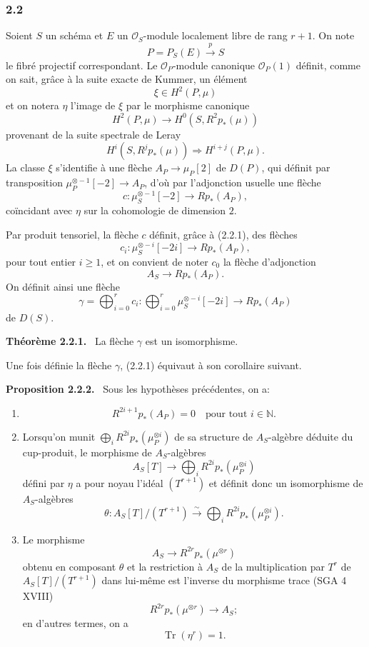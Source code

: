\documentclass[11pt]{article}
\newenvironment{statement}[1]{\par\medskip\noindent\textbf{#1.}\ }{\par\medskip}
\begin{document}
\subsubsection*{2.2}
Soient $S$ un schéma et $E$ un $\mathcal O_S$-module localement libre de rang $r+1$. On note
\[
P=P_S(E)\xrightarrow{p}S
\]
le fibré projectif correspondant. Le $\mathcal O_P$-module canonique $\mathcal O_P(1)$ définit, comme on sait, grâce à la suite exacte de Kummer, un élément
\[
\xi\in H^2(P,\mu)
\]
et on notera $\eta$ l'image de $\xi$ par le morphisme canonique
\[
H^2(P,\mu)\longrightarrow H^0(S,R^2p_*(\mu))
\]
provenant de la suite spectrale de Leray
\[
H^i(S,R^jp_*(\mu))\Rightarrow H^{i+j}(P,\mu).
\]
La classe $\xi$ s'identifie à une flèche $A_P\to\mu_P[2]$ de $D(P)$, qui définit par transposition $\mu_P^{\otimes -1}[-2]\to A_P$, d'où par l'adjonction usuelle une flèche
\[
c:\mu_S^{\otimes -1}[-2]\longrightarrow Rp_*(A_P),
\]
coïncidant avec $\eta$ sur la cohomologie de dimension $2$.

Par produit tensoriel, la flèche $c$ définit, grâce à (2.2.1), des flèches
\[
c_i:\mu_S^{\otimes -i}[-2i]\longrightarrow Rp_*(A_P),
\]
pour tout entier $i\ge1$, et on convient de noter $c_0$ la flèche d'adjonction
\[
A_S\longrightarrow Rp_*(A_P).
\]
On définit ainsi une flèche
\[
\gamma=\bigoplus_{i=0}^{r}c_i:
\bigoplus_{i=0}^{r}\mu_S^{\otimes -i}[-2i]\longrightarrow Rp_*(A_P)
\]
de $D(S)$.

\begin{statement}{Théorème 2.2.1}
La flèche $\gamma$ est un isomorphisme.
\end{statement}

Une fois définie la flèche $\gamma$, (2.2.1) équivaut à son corollaire suivant.

\begin{statement}{Proposition 2.2.2}
Sous les hypothèses précédentes, on a:
\begin{enumerate}[label=\alph*)]
\item
\[
R^{2i+1}p_*(A_P)=0\quad\text{pour tout }i\in\mathbb N.
\]
\item Lorsqu'on munit $\bigoplus_i R^{2i}p_*(\mu_P^{\otimes i})$ de sa structure de $A_S$-algèbre déduite du cup-produit, le morphisme de $A_S$-algèbres
\[
A_S[T]\longrightarrow \bigoplus_i R^{2i}p_*(\mu_P^{\otimes i})
\]
défini par $\eta$ a pour noyau l'idéal $(T^{r+1})$ et définit donc un isomorphisme de $A_S$-algèbres
\[
\theta:A_S[T]/(T^{r+1})\xrightarrow{\sim}\bigoplus_i R^{2i}p_*(\mu_P^{\otimes i}).
\]
\item Le morphisme
\[
A_S\longrightarrow R^{2r}p_*(\mu^{\otimes r})
\]
obtenu en composant $\theta$ et la restriction à $A_S$ de la multiplication par $T^r$ de $A_S[T]/(T^{r+1})$ dans lui-même est l'inverse du morphisme trace (SGA 4 XVIII)
\[
R^{2r}p_*(\mu^{\otimes r})\longrightarrow A_S;
\]
en d'autres termes, on a
\[
\operatorname{Tr}(\eta^r)=1.
\]
\end{enumerate}
\end{statement}
\end{document}
